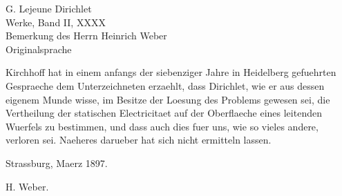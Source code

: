 \documentclass[11pt]{article}
\newcommand{\paperhead}[3]{\begin{center}{\Large G. Lejeune Dirichlet}\\[0.25em]{\large Werke, Band II, #1}\\[0.75em]{\LARGE #2}\\[0.35em]{\large #3}\end{center}\bigskip}
\newcommand{\sign}[1]{\begin{flushright}#1\end{flushright}}
\begin{document}
\paperhead{XXXX}{Bemerkung des Herrn Heinrich Weber}{Originalsprache}

Kirchhoff hat in einem anfangs der siebenziger Jahre in Heidelberg gefuehrten Gespraeche dem Unterzeichneten erzaehlt, dass Dirichlet, wie er aus dessen eigenem Munde wisse, im Besitze der Loesung des Problems gewesen sei, die Vertheilung der statischen Electricitaet auf der Oberflaeche eines leitenden Wuerfels zu bestimmen, und dass auch dies fuer uns, wie so vieles andere, verloren sei. Naeheres darueber hat sich nicht ermitteln lassen.

Strassburg, Maerz 1897.\sign{H. Weber.}
\end{document}
